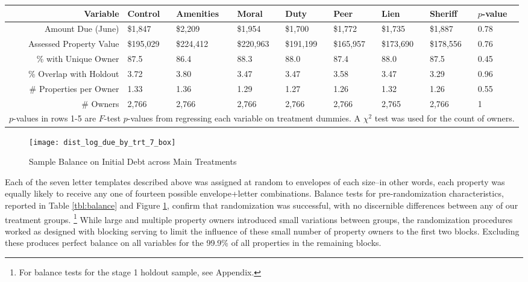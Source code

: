\documentclass[12pt,titlepage]{article}
\begin{document}
\begin{sidewaystable}[ht]
\centering
\begin{tabular}{|r|lllllll|l|}
   \hline
Variable & Control & Amenities & Moral & Duty & Peer & Lien & Sheriff & $p$-value \\ 
   \hline
Amount Due (June) & \$1,847 & \$2,209 & \$1,954 & \$1,700 & \$1,772 & \$1,735 & \$1,887 & 0.78 \\ 
  Assessed Property Value & \$195,029 & \$224,412 & \$220,963 & \$191,199 & \$165,957 & \$173,690 & \$178,556 & 0.76 \\ 
  \% with Unique Owner & 87.5 & 86.4 & 88.3 & 88.0 & 87.4 & 88.0 & 87.5 & 0.45 \\ 
  \% Overlap with Holdout & 3.72 & 3.80 & 3.47 & 3.47 & 3.58 & 3.47 & 3.29 & 0.96 \\ 
  \# Properties per Owner & 1.33 & 1.36 & 1.29 & 1.27 & 1.26 & 1.32 & 1.26 & 0.55 \\ 
  \# Owners & 2,766 & 2,766 & 2,766 & 2,766 & 2,766 & 2,765 & 2,766 & 1 \\ 
   \hline 
 \multicolumn{9}{l}{\scriptsize{$p$-values in rows 1-5 are $F$-test $p$-values from regressing each variable on treatment dummies. A $\chi^2$ test was used for the count of owners.}} \\ 
\end{tabular}
\caption{Balance on Observables} 
\label{tbl:balance}
\end{sidewaystable}

\begin{figure}[htpb]
\begin{center}
\caption{Sample Balance on Initial Debt across Main Treatments}
\label{fig:box_bal}
\bigskip
\texttt{[image: dist\_log\_due\_by\_trt\_7\_box]}
\end{center}
\end{figure}

Each of the seven letter templates described above was assigned at random 
to envelopes of each size--in other words, each property was equally 
likely to receive any one of fourteen possible envelope+letter combinations. 
Balance tests for pre-randomization characteristics, 
reported in Table \ref{tbl:balance} and Figure \ref{fig:box_bal}, 
confirm that randomization was successful, 
with no discernible differences between any of our treatment groups.
\footnote{For balance tests for the stage 1 holdout sample, see Appendix.}
While large and multiple property owners introduced small variations 
between groups, the randomization procedures worked as designed with 
blocking serving to limit the influence of these small number of property 
owners to the first two blocks. Excluding these produces perfect balance 
on all variables for the 99.9\% of all properties in the remaining blocks.
\end{document}
